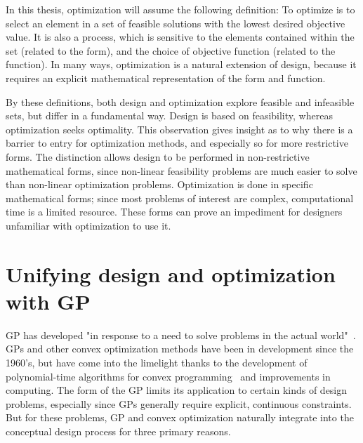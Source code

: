 In this thesis, optimization will assume the following definition: To optimize is to select an
element in a set of feasible solutions with the lowest desired objective
value. It is also a process, which is sensitive to the elements contained within the set
(related to the form), and the choice of objective function (related to the
function).
In many ways, optimization is a natural extension of design, because it requires
an explicit mathematical representation of the form and function.

By these definitions, both design and
optimization explore feasible and infeasible sets, but differ in a fundamental way.
Design is based on feasibility, whereas optimization seeks optimality.
This observation gives insight as to why there is a barrier
to entry for optimization methods, and especially so for more restrictive forms.
The distinction allows design to be performed
in non-restrictive mathematical forms, since non-linear feasibility problems are
much easier to solve than non-linear optimization problems. Optimization is
done in specific mathematical forms; since most problems of interest are complex,
computational time is a limited resource. These forms can prove
an impediment for designers unfamiliar with optimization to use it.

\section{Unifying design and optimization with GP}

\gls{GP} has developed "in response to a need to solve problems in the actual
world"~\cite{duffingp}. \gls{GP}s and other convex optimization methods have been
in development since the 1960's, but have come into the limelight thanks to the development of
polynomial-time algorithms for convex programming~\cite{interior_point} and
improvements in computing. The form of the \gls{GP} limits its application
to certain kinds of design
problems, especially since \gls{GP}s generally require explicit, continuous constraints.
But for these problems, \gls{GP} and convex
optimization naturally integrate into the conceptual design process
for three primary reasons.


